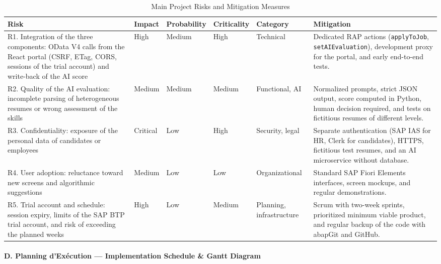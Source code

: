 \begin{table}[H]
\centering
\caption{Main Project Risks and Mitigation Measures}
\label{tab:risk_matrix}
\renewcommand{\arraystretch}{1.3}
\setlength{\tabcolsep}{4pt}
\footnotesize
\begin{tabular}{|>{\raggedright\arraybackslash}p{4.0cm}|>{\raggedright\arraybackslash}p{1.3cm}|>{\raggedright\arraybackslash}p{2.0cm}|>{\raggedright\arraybackslash}p{1.85cm}|>{\raggedright\arraybackslash}p{2.35cm}|>{\raggedright\arraybackslash}p{5.25cm}|}
\hline
\textbf{Risk} & \textbf{Impact} & \textbf{Probability} & \textbf{Criticality} & \textbf{Category} & \textbf{Mitigation} \\
\hline
R1. Integration of the three components: OData V4 calls from the React portal (CSRF, ETag, CORS, sessions of the trial account) and write-back of the AI score & High & Medium & High & Technical & Dedicated RAP actions (\texttt{applyToJob}, \texttt{setAIEvaluation}), development proxy for the portal, and early end-to-end tests. \\
\hline
R2. Quality of the AI evaluation: incomplete parsing of heterogeneous resumes or wrong assessment of the skills & Medium & Medium & Medium & Functional, AI & Normalized prompts, strict JSON output, score computed in Python, human decision required, and tests on fictitious resumes of different levels. \\
\hline
R3. Confidentiality: exposure of the personal data of candidates or employees & Critical & Low & High & Security, legal & Separate authentication (SAP IAS for HR, Clerk for candidates), HTTPS, fictitious test resumes, and an AI microservice without database. \\
\hline
R4. User adoption: reluctance toward new screens and algorithmic suggestions & Medium & Low & Low & Organizational & Standard SAP Fiori Elements interfaces, screen mockups, and regular demonstrations. \\
\hline
R5. Trial account and schedule: session expiry, limits of the SAP BTP trial account, and risk of exceeding the planned weeks & High & Low & Medium & Planning, infrastructure & Scrum with two-week sprints, prioritized minimum viable product, and regular backup of the code with abapGit and GitHub. \\
\hline
\end{tabular}
\end{table}

\paragraph{D. Planning d'Ex\'{e}cution --- Implementation Schedule \& Gantt Diagram}

